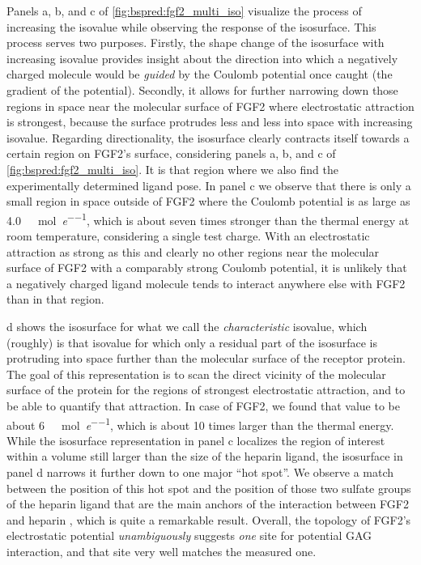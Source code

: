 Panels a, b, and c of \cref{fig:bspred:fgf2_multi_iso} visualize the process of
increasing the isovalue while observing the response of the isosurface. This
process serves two purposes. Firstly, the shape change of the isosurface with
increasing isovalue provides insight about the direction into which a negatively
charged molecule would be \textit{guided} by the Coulomb potential once caught
(the gradient of the potential). Secondly, it allows for further narrowing down
those regions in space near the molecular surface of FGF2 where electrostatic
attraction is strongest, because the surface protrudes less and less into space
with increasing isovalue. Regarding directionality, the isosurface clearly
contracts itself towards a certain region on FGF2's surface, considering panels
a, b, and c of \cref{fig:bspred:fgf2_multi_iso}. It is that region where we also
find the experimentally determined ligand pose. In panel c we observe that there
is only a small region in space outside of FGF2 where the Coulomb potential is
as large as
\SI{4.0}{\kilo\calory\per\mole\per\elementarycharge}, which is about seven times
stronger than the thermal energy at room temperature, considering a single test
charge. With an electrostatic attraction as strong as this and clearly no other
regions near the molecular surface of FGF2 with a comparably strong Coulomb
potential, it is unlikely that a negatively charged ligand molecule tends to
interact anywhere else with FGF2 than in that region.

d shows the isosurface for what we call the
\textit{characteristic} isovalue, which (roughly) is that isovalue for which
only a residual part of the isosurface is protruding into space further than the
molecular surface of the receptor protein. The goal of this representation is to
scan the direct vicinity of the molecular surface of the protein for the regions
of strongest electrostatic attraction, and to be able to quantify that
attraction. In case of FGF2, we found that value to be about
\SI{6}{\kilo\calory\per\mole\per\elementarycharge}, which is about 10 times
larger than the thermal energy. While the isosurface representation in panel c
localizes the region of interest within a volume still larger than the size of
the heparin ligand, the isosurface in panel d narrows it further down to one
major \enquote{hot spot}. We observe a match between the position of this hot
spot and the position of those two sulfate groups of the heparin ligand that are
the main anchors of the interaction between FGF2 and heparin
\cite{faham_heparin_1996}, which is quite a remarkable result. Overall, the
topology of FGF2's electrostatic potential \textit{unambiguously} suggests
\textit{one} site for potential GAG interaction, and that site very well matches
the measured one.


